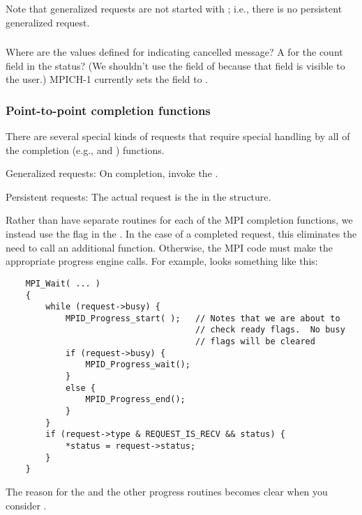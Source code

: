 \documentclass{article}
\begin{document}
Note that generalized requests are not started with ; i.e.,
there is no persistent generalized request.

\subsubsection{}
Where are the values defined for indicating cancelled message?
A  for the count field in the
status?
(We shouldn't use the  field of
 because that field is visible to the user.)
MPICH-1 currently sets the  field to .

\subsubsection{Point-to-point completion functions}
There are several special kinds of requests that require special handling by
all of the completion (e.g.,  and )
functions. 

Generalized requests:  On completion, invoke the
. 

Persistent requests: The actual request is the
 in the
 structure.

Rather than have separate routines for each of the MPI completion
functions, we instead use the  flag in the
.  In the case of a completed request, this
eliminates the need to call an additional function.  Otherwise, the
MPI code must make the appropriate progress engine calls.  For
example,  looks something like this:
\begin{verbatim}
    MPI_Wait( ... )
    {
        while (request->busy) {
            MPID_Progress_start( );   // Notes that we are about to
                                      // check ready flags.  No busy 
                                      // flags will be cleared
            if (request->busy) {
                MPID_Progress_wait();
            }
            else {
                MPID_Progress_end();
            }
        }
        if (request->type & REQUEST_IS_RECV && status) {
            *status = request->status;
        }
    }
\end{verbatim}
The reason for the  and the other
progress routines becomes clear when you consider .
\end{document}
